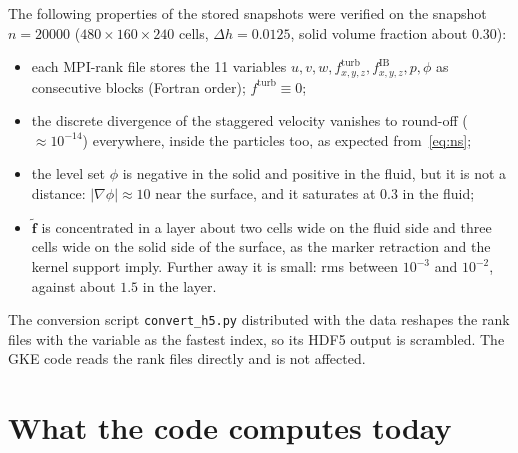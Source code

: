 \documentclass[11pt,a4paper]{article}
\newcommand{\vect}[1]{\boldsymbol{#1}}
\begin{document}
The following properties of the stored snapshots were verified on the
snapshot $n=20000$ ($480\times160\times240$ cells, $\Delta h=0.0125$, solid
volume fraction about $0.30$):
\begin{itemize}[itemsep=1pt]
\item each MPI-rank file stores the 11 variables $u,v,w,f^\mathrm{turb}_{x,y,z},
  f^\mathrm{IB}_{x,y,z},p,\phi$ as consecutive blocks (Fortran order);
  $f^\mathrm{turb}\equiv0$;
\item the discrete divergence of the staggered velocity vanishes to round-off
  ($\approx10^{-14}$) everywhere, inside the particles too, as expected
  from~\eqref{eq:ns};
\item the level set $\phi$ is negative in the solid and positive in the fluid,
  but it is not a distance: $|\nabla\phi|\approx10$ near the surface, and it
  saturates at $0.3$ in the fluid;
\item $\tilde{\vect f}$ is concentrated in a layer about two cells wide on
  the fluid side and three cells wide on the solid side of the surface, as the
  marker retraction and the kernel support imply. Further away it is small:
  rms between $10^{-3}$ and $10^{-2}$, against about $1.5$ in the layer.
\end{itemize}
The conversion script \texttt{convert\_h5.py} distributed with the data
reshapes the rank files with the variable as the fastest index, so its HDF5
output is scrambled. The GKE code reads the rank files directly and is not
affected.

\section{What the code computes today}
\label{sec:current}
\end{document}
